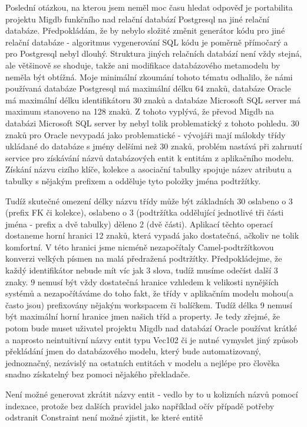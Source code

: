 \documentclass[11pt,twoside,a4paper]{book}
\begin{document}
Poslední otázkou, na kterou jsem neměl moc času hledat odpověď je portabilita
projektu Migdb funkčního nad relační databází Postgresql na jiné
relační databáze. Předpokládám, že by nebylo složité změnit generátor kódu
pro jiné relační databáze - algoritmus vygenerování SQL kódu je poměrně
přímočarý a pro Postgresql nebyl dlouhý. Struktura jiných relačních databází
není vždy stejná, ale většinově se shoduje, takže ani modifikace databázového
metamodelu by neměla být obtížná. Moje minimální zkoumání tohoto tématu
odhalilo, že námi používaná databáze Postgresql má maximální délku 64 znaků, 
databáze Oracle má maximální délku identifikátoru 30 znaků a databáze Microsoft 
SQL server má maximum stanoveno na 128 znaků. Z tohoto vyplývá, že převod Migdb 
na databázi Microsoft SQL server by nebyl tolik problematický z tohoto pohledu.
30 znaků pro Oracle nevypadá jako problematické - vývojáři mají málokdy třídy
ukládané do databáze s jmény delšími než 30 znaků, problém nastává při zahrnutí
service pro získávání názvů databázových entit k entitám z aplikačního modelu.
Získání názvu cizího klíče, kolekce a asociační tabulky spojuje název atributu a
tabulky s nějakým prefixem a odděluje tyto položky jména podtržítky. 

Tudíž skutečné omezení délky názvu třídy může být základních 30 oslabeno o 3
(prefix FK či kolekce), oslabeno o 3 (podtržítka oddělující jednotlivé tři
části jména - prefix a dvě tabulky) děleno 2 (dvě části). Aplikací těchto
operací dostaneme horní hranici 12 znaků, která vypadá jako dostatečná, ačkoliv 
ne tolik komfortní. V této hranici jsme nicméně nezapočítaly Camel-podtržítkovou
konverzi velkých písmen na malá předražená podtržítky. Předpokládejme, že každý
identifikátor nebude mít víc jak 3 slova, tudíž musíme odečíst další 3 znaky. 9
nemusí být vždy dostatečná hranice vzhledem k velikosti nynějších systémů a
nezapočítáváme do toho fakt, že třídy v aplikačním modelu mohou(a často jsou)
prefixovány nějakým workspacem či balíčkem. Tudíž délka 9 nemusí být maximální
horní hranice jmen našich tříd a property. Je tedy zřejmé, že potom bude muset
uživatel projektu Migdb nad databází Oracle používat krátké a naprosto
neintuitivní názvy entit typu Vec102 či je nutné vymyslet jiný způsob překládání
jmen do databázového modelu, který bude automatizovaný, jednoznačný, nezávislý
na ostatních entitách v modelu a nejlépe pro člověka snadno získatelný bez
pomoci nějakého překladače.

Není možné generovat zkrátit názvy entit - vedlo by to u kolizních názvů pomocí
indexace, protože bez dalších pravidel jako například očív případě potřeby
odstranit Constraint není možné zjistit, ke které entitě
\end{document}
